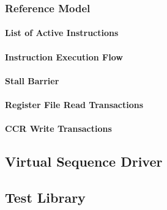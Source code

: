 \subsubsection{Reference Model}

\paragraph{List of Active Instructions}

\paragraph{Instruction Execution Flow}

\paragraph{Stall Barrier}

\paragraph{Register File Read Transactions}

\paragraph{CCR Write Transactions}

\subsection{Virtual Sequence Driver}

\subsection{Test Library}